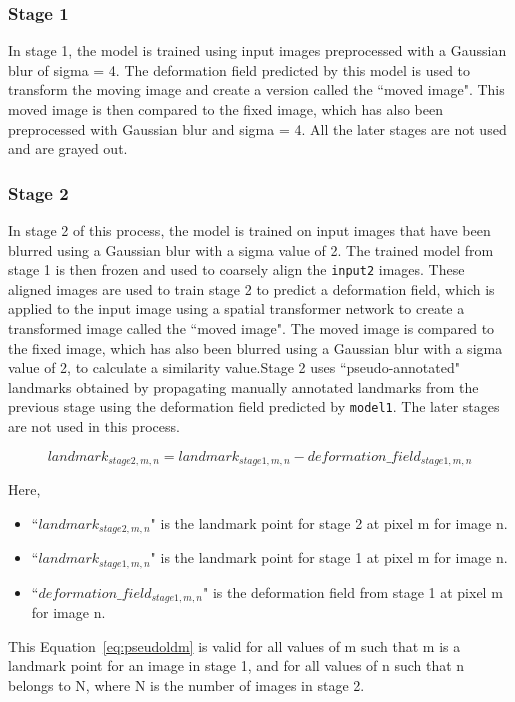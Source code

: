 \documentclass{book}
\begin{document}
	\subsubsection{Stage 1}
	In stage 1, the model is trained using input images preprocessed with a Gaussian blur of sigma = 4. The deformation field predicted by this model is used to transform the moving image and create a version called the ``moved image". This moved image is then compared to the fixed image, which has also been preprocessed with Gaussian blur and sigma = 4. All the later stages are not used and are grayed out.

	\subsubsection{Stage 2}
	In stage 2 of this process, the model is trained on input images that have been blurred using a Gaussian blur with a sigma value of 2. The trained model from stage 1 is then frozen and used to coarsely align the \texttt{input2} images. These aligned images are used to train stage 2 to predict a deformation field, which is applied to the input image using a spatial transformer network to create a transformed image called the ``moved image". The moved image is compared to the fixed image, which has also been blurred using a Gaussian blur with a sigma value of 2, to calculate a similarity value.Stage 2 uses ``pseudo-annotated" landmarks obtained by propagating manually annotated landmarks from the previous stage using the deformation field predicted by \texttt{model1}. The later stages are not used in this process.
	
	\begin{equation}\label{eq:pseudoldm}
		landmark_{stage2,m,n} = landmark_{stage1,m,n} - deformation\_field_{stage1,m,n}
	\end{equation}
	
	Here, 
	\begin{itemize}
		\item ``$landmark_{stage2,m,n}$" is the landmark point for stage 2 at pixel m for image n.
		\item ``$landmark_{stage1,m,n}$" is the landmark point for stage 1 at pixel m for image n.
		\item ``$deformation\_field_{stage1,m,n}$" is the deformation field from stage 1 at pixel m for image n.    
	\end{itemize}
	
	This Equation~\ref{eq:pseudoldm} is valid for all values of m such that m is a landmark point for an image in stage 1, and for all values of n such that n belongs to N, where N is the number of images in stage 2.
\end{document}

